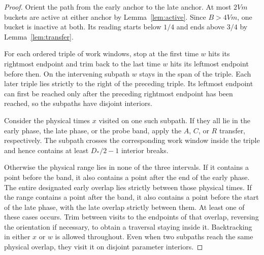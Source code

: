 \begin{proof}
Orient the path from the early anchor to the late anchor. At most
\(2Vm\) buckets are active at either anchor by Lemma~\ref{lem:active}.
Since \(B>4Vm\), one bucket is inactive at both. Its reading starts
below \(1/4\) and ends above \(3/4\) by Lemma~\ref{lem:transfer}.

For each ordered triple of work windows, stop at the first time
\(w\) hits its rightmost endpoint and trim back to the last time
\(w\) hits its leftmost endpoint before then. On the intervening
subpath \(w\) stays in the span of the triple. Each later triple
lies strictly to the right of the preceding triple. Its leftmost
endpoint can first be reached only after the preceding rightmost
endpoint has been reached, so the subpaths have disjoint interiors.

Consider the physical times \(x\) visited on one such subpath.
If they all lie in the early phase, the late phase, or the probe band,
apply the \(A\), \(C\), or \(R\) transfer, respectively. The subpath
crosses the corresponding work window inside the triple and hence
contains at least \(D_*/2-1\) interior breaks.

Otherwise the physical range lies in none of the three intervals.
If it contains a point before the band, it also contains a point
after the end of the early phase. The entire designated early overlap
lies strictly between those physical times. If the range contains
a point after the band, it also contains a point before the start
of the late phase, with the late overlap strictly between them.
At least one of these cases occurs. Trim between visits to the
endpoints of that overlap, reversing the orientation if necessary,
to obtain a traversal staying inside it. Backtracking in either
\(x\) or \(w\) is allowed throughout. Even when two subpaths reach
the same physical overlap, they visit it on disjoint parameter
interiors.
\end{proof}
